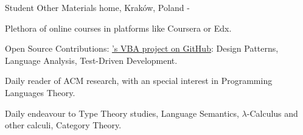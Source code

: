\begin{cventries}
\cventry
	{Student}
	{Other Materials}
	{home, Kraków, Poland}
	{-}
	{
		\begin{cvitems} %
            \item {Plethora of online courses in platforms like Coursera or Edx.}
            \item {Open Source Contributions: \href{https://github.com/rubberduck-vba/Rubberduck}{'s VBA project on GitHub}: Design Patterns, Language Analysis, Test-Driven Development.}
            \item {Daily reader of ACM research, with an special interest in Programming Languages Theory.}
			\item {Daily endeavour to Type Theory studies, Language Semantics, $\lambda$-Calculus and other calculi, Category Theory.}
        \end{cvitems}
	}

\end{cventries}
